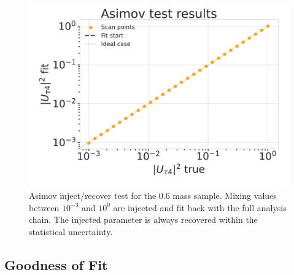 

\begin{figure}[h]
    \includegraphics{figures/results/checks/asimov_scan_0.6_GeV-01.png}
	\caption[Asimov inject/recover test (\SI{0.6}{\gev})]{Asimov inject/recover test for the \SI{0.6}{\gev} mass sample. Mixing values between $10^{-3}$ and $10^{0}$ are injected and fit back with the full analysis chain. The injected parameter is always recovered within the statistical uncertainty.}
\end{figure}


\subsection{Goodness of Fit} 


